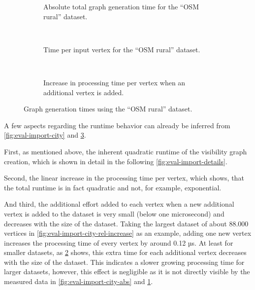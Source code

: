 \begin{figure}[h!]
\begin{minipage}{.48\textwidth}
\begin{subfigure}[t]{\linewidth}
\begin{figcenter}
						
					\end{figcenter}
					\caption{Absolute total graph generation time for the \enquote{OSM rural} dataset.}
					\label{fig:eval-import-rural-abs}
				\end{subfigure}
				\\[3ex]
				\begin{subfigure}[t]{\linewidth}
					\begin{figcenter}
						
					\end{figcenter}
					\caption{Time per input vertex for the \enquote{OSM rural} dataset.}
				\end{subfigure}
				\\[3ex]
				\begin{subfigure}[t]{\linewidth}
					\begin{figcenter}
						
					\end{figcenter}
					\caption{Increase in processing time per vertex when an additional vertex is added.}
					\label{fig:eval-import-rural-rel-increase}
				\end{subfigure}
				\caption{Graph generation times using the \enquote{OSM rural} dataset.}
				\label{fig:eval-import-rural}
			\end{minipage}
		\end{figure}
		
		A few aspects regarding the runtime behavior can already be inferred from \cref{fig:eval-import-city} and \cref{fig:eval-import-rural}.
		
		First, as mentioned above, the inherent quadratic runtime of the visibility graph creation, which is shown in detail in the following \cref{fig:eval-import-details}.
		
		Second, the linear increase in the processing time per vertex, which shows, that the total runtime is in fact quadratic and not, for example, exponential.
		
		And third, the additional effort added to each vertex when a new additional vertex is added to the dataset is very small (below one microsecond) and decreases with the size of the dataset.
		Taking the largest dataset of about 88.000 vertices in \cref{fig:eval-import-city-rel-increase} as an example, adding one new vertex increases the processing time of every vertex by around 0.12 µs.
		At least for smaller datasets, as \cref{fig:eval-import-rural-rel-increase} shows, this extra time for each additional vertex decreases with the size of the dataset.
		This indicates a slower growing processing time for larger datasets, however, this effect is negligible as it is not directly visible by the measured data in \cref{fig:eval-import-city-abs} and \cref{fig:eval-import-rural-abs}.
		
